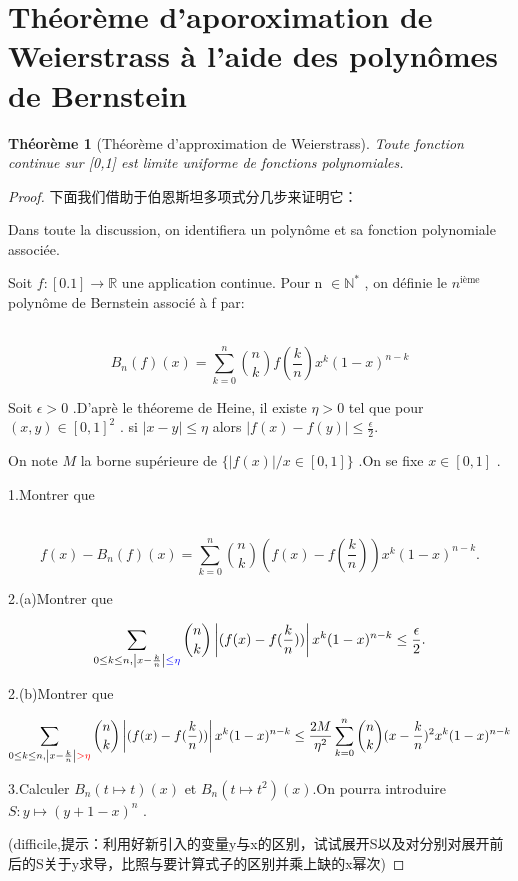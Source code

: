 \documentclass[12pt]{book}
\theoremstyle{definition}\newtheorem{dfn}{Définition}[chapter]
\theoremstyle{plain}\newtheorem{thm}{Théorème}[chapter]
\theoremstyle{plain}\newtheorem{prp}{Proposition}[chapter]
\theoremstyle{plain}\newtheorem{lem}{\bf Lemme}[chapter]
\theoremstyle{plain}\newtheorem{axm}{\bf Axiome}[chapter]
\theoremstyle{plain}\newtheorem{lmm}{\bf Lemme}[chapter]
\theoremstyle{plain}\newtheorem{exm}{\bf Example}[chapter]
\theoremstyle{plain}\newtheorem{cor}{\bf Corollaire}[chapter]
\theoremstyle{remark}\newtheorem{rem}{Remarque}[chapter]
\begin{document}
\section{Théorème d'aporoximation de Weierstrass à l'aide des polynômes de Bernstein}
\begin{thm}[Théorème d'approximation de Weierstrass]
Toute fonction continue sur [0,1] est limite uniforme de fonctions polynomiales. 
\end{thm}
\begin{proof}
下面我们借助于伯恩斯坦多项式分几步来证明它：

Dans toute la discussion, on identifiera un polynôme et sa fonction polynomiale associée.

Soit  $f: [0.1] \rightarrow \mathbb{R}$ une application continue. Pour n $\in \mathbb N ^{*}$ , on définie le $n^{\text{ième}}$  polynôme de Bernstein associé à f par:

​$$\boxed{B_{n}(f)(x) = \sum_{k=0}^{n}\binom{n}{k}f(\frac{k}{n})x^k(1-x)^{n-k}}$$ 

Soit $\epsilon > 0$ .D'aprè le théoreme de Heine, il existe $\eta > 0$ tel que pour $(x,y) \in [0,1]^2$ . si $\left | x-y \right | \le\eta$  alors       $\left | f(x)-f(y) \right | \le\frac{\epsilon}{2}.$  

On note $M$  la borne supérieure de $\{\left |f(x)\right| / x\in [0,1]\}$ .On se fixe $x\in [0,1]$ .


1.Montrer que 

​ $$f(x)-B_{n}(f)(x) = \sum_{k=0}^{n}\binom{n}{k}(f(x)-f(\frac{k}{n}))x^k(1-x)^{n-k}.$$



2.(a)Montrer que

$$\sum_{0\le k\le n, \left | x-\frac{k}{n} \right | \color{blue}{\le}\eta}\binom{n}{k}\left|(f(x)-f(\frac{k}{n}))\right|x^k(1-x)^{n-k}\le\frac{\epsilon}{2}.$$ 

​2.(b)Montrer que 

$$\sum_{0\le k\le n, \left | x-\frac{k}{n} \right | \color{red}{>}\eta}\binom{n}{k}\left|(f(x)-f(\frac{k}{n}))\right|x^k(1-x)^{n-k}\le\frac{2M}{\eta^2}\sum_{k=0}^{n}\binom{n}{k}(x-\frac{k}{n})^2x^k(1-x)^{n-k}$$



3.Calculer $B_{n}(t\mapsto t)(x)$ et $B_{n}(t\mapsto t^2)(x)$.On pourra introduire $S:  y\mapsto (y+1-x)^n$ .

(difficile,提示：利用好新引入的变量y与x的区别，试试展开S以及对分别对展开前后的S关于y求导，比照与要计算式子的区别并乘上缺的x幂次)


\end{proof}
\end{document}
